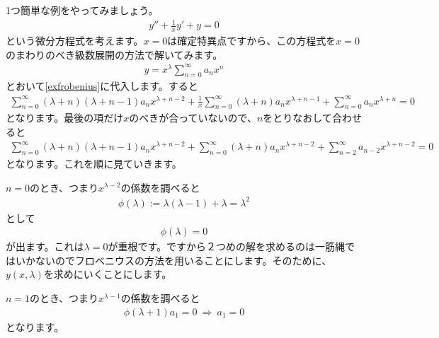 \documentclass[report,paper=a4, fontsize=12pt, line_length=16cm, number_of_lines=33,dvipdfmx]{jlreq}
\numberwithin{equation}{section}
\begin{document}
1つ簡単な例をやってみましょう。
\begin{align}
  y''+\frac{1}{x}y'+y=0\label{exfrobenius}
\end{align}
という微分方程式を考えます。$x=0$は確定特異点ですから、この方程式を$x=0$のまわりのべき級数展開の方法で解いてみます。
\begin{align}
  y=x^{\lambda}\sum_{n=0}^{\infty}a_nx^{n}
\end{align}
とおいて\eqref{exfrobenius}に代入します。すると
\begin{align}
  \sum_{n=0}^{\infty}(\lambda+n)(\lambda+n-1)a_n x^{\lambda+n-2}
  +\frac{1}{x}\sum_{n=0}^{\infty}(\lambda+n)a_nx^{\lambda+n-1}
  +\sum_{n=0}^{\infty}a_{n}x^{\lambda+n}=0
\end{align}
となります。最後の項だけ$x$のべきが合っていないので、$n$をとりなおして合わせると
\begin{align}
  \sum_{n=0}^{\infty}(\lambda+n)(\lambda+n-1)a_n x^{\lambda+n-2}
  +\sum_{n=0}^{\infty}(\lambda+n)a_n x^{\lambda+n-2}
  +\sum_{n=2}^{\infty}a_{n-2}x^{\lambda+n-2}=0
\end{align}
となります。これを順に見ていきます。

$n=0$のとき、つまり$x^{\lambda-2}$の係数を調べると
\begin{align}
  \phi(\lambda):=\lambda(\lambda-1)+\lambda=\lambda^2
\end{align}
として
\begin{align}
  \phi(\lambda)=0
\end{align}
が出ます。これは$\lambda=0$が重根です。ですから２つめの解を求めるのは一筋縄ではいかないのでフロベニウスの方法を用いることにします。そのために、$y(x,\lambda)$を求めにいくことにします。

$n=1$のとき、つまり$x^{\lambda-1}$の係数を調べると
\begin{align}
  \phi(\lambda+1) a_1=0
  \ \Rightarrow\ 
  a_1=0
\end{align}
となります。
\end{document}
